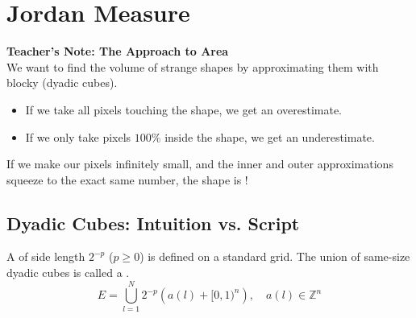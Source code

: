 \section{Jordan Measure} %

\begin{extra}
\textbf{Teacher's Note: The  Approach to Area}\\
We want to find the volume of strange shapes by approximating them with blocky  (dyadic cubes). 
\begin{itemize}
    \item If we take all pixels touching the shape, we get an  overestimate.
    \item If we only take pixels $100\%$ inside the shape, we get an  underestimate.
\end{itemize}
If we make our pixels infinitely small, and the inner and outer approximations squeeze to the exact same number, the shape is !
\end{extra}

\subsection{Dyadic Cubes: Intuition vs. Script}

\begin{theorem*} %
A  of side length $2^{-p}$ ($p \ge 0$) is defined on a standard grid. The union of same-size dyadic cubes is called a . %
\[
E = \bigcup_{l=1}^N 2^{-p}\left(a(l) + [0,1)^n\right), \quad a(l) \in \mathbb{Z}^n
\]
\end{theorem*}

